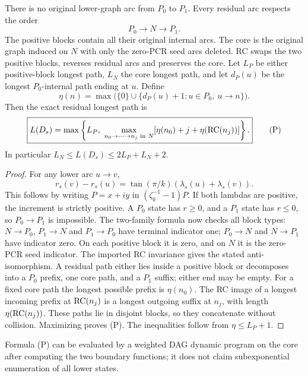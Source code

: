 \begin{theorem}\label{ext:thm:paths}
There is no original lower-graph arc from $P_0$ to $P_1$. Every residual arc respects the order
\[
P_0\longrightarrow N\longrightarrow P_1.
\]
The positive blocks contain all their original internal arcs. The core is the original graph induced on $N$ with only the zero-PCR seed arcs deleted. RC swaps the two positive blocks, reverses residual arcs and preserves the core.
Let $L_P$ be either positive-block longest path, $L_N$ the core longest path, and let $d_P(u)$ be the longest $P_0$-internal path ending at $u$. Define
\[
\eta(n)=\max\bigl(\{0\}\cup\{d_P(u)+1:u\in P_0,\ u\to n\}\bigr).
\]
Then the exact residual longest path is
\[
\boxed{L(D_s)=\max\left\{L_P,\
\max_{n_0\to\cdots\to n_j\text{ in }N}
[\eta(n_0)+j+\eta(\operatorname{RC}(n_j))]\right\}.}                         \tag{P}
\]
In particular $L_N\le L(D_s)\le2L_P+L_N+2$.
\end{theorem}
\begin{proof}
For any lower arc $u\to v$,
\[
r_s(v)-r_s(u)=\tan(\pi/k)(\lambda_s(u)+\lambda_s(v)).
\]
This follows by writing $P=x+iy$ in $(\zeta_k^{-1}-1)P$. If both lambdas are positive, the increment is strictly positive. A $P_0$ state has $r\ge0$, and a $P_1$ state has $r\le0$, so $P_0\to P_1$ is impossible. The two-family formula now checks all block types: $N\to P_0$, $P_1\to N$ and $P_1\to P_0$ have terminal indicator one; $P_0\to N$ and $N\to P_1$ have indicator zero. On each positive block it is zero, and on $N$ it is the zero-PCR seed indicator. The imported RC invariance gives the stated anti-isomorphism.
A residual path either lies inside a positive block or decomposes into a $P_0$ prefix, one core path, and a $P_1$ suffix; either end may be empty. For a fixed core path the longest possible prefix is $\eta(n_0)$. The RC image of a longest incoming prefix at $\operatorname{RC}(n_j)$ is a longest outgoing suffix at $n_j$, with length $\eta(\operatorname{RC}(n_j))$. These paths lie in disjoint blocks, so they concatenate without collision. Maximizing proves (P). The inequalities follow from $\eta\le L_P+1$.
\end{proof}
Formula (P) can be evaluated by a weighted DAG dynamic program on the core after computing the two boundary functions; it does not claim subexponential enumeration of all lower states.

